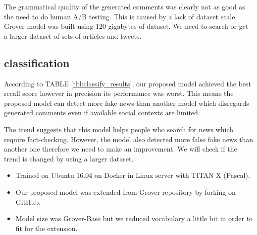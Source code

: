 \documentclass[conference]{IEEEtran}
\begin{document}
The grammatical quality of the generated comments was clearly not as good as the need to do human A/B testing.
This is caused by a lack of dataset scale. 
Grover model was built using 120 gigabytes of dataset\cite{NIPS2019_9106}.
We need to search or get a larger dataset of sets of articles and tweets.

\subsection{classification}
According to TABLE \ref{tbl:classify_results}, our proposed model achieved the best recall score however in precision its performance was worst.
This means the proposed model can detect more fake news than another model which disregards generated comments even if available social contexts are limited. 

The trend suggests that this model helps people who search for news which require fact-checking. 
However, the model also detected more false fake news than another one therefore we need to make an improvement.
We will check if the trend is changed by using a larger dataset.

\label{app:settings}
\begin{itemize}[]
    \item Trained on Ubuntu 16.04 on Docker in Linux server with TITAN X (Pascal).
    \item Our proposed model was extended from Grover repository by forking on GitHub.
    \item Model size was Grover-Base but we reduced vocabulary a little bit in order to fit for the extension.
\end{itemize}


\end{document}
